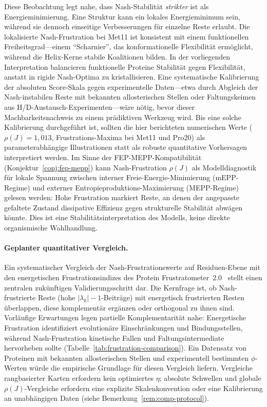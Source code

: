 \documentclass[12pt,a4paper]{article}
\theoremstyle{remark}
\begin{document}
Diese Beobachtung legt nahe, dass Nash-Stabilität \textit{strikter} ist als Energieminimierung. Eine Struktur kann ein lokales Energieminimum sein, während sie dennoch einseitige Verbesserungen für einzelne Reste erlaubt. Die lokalisierte Nash-Frustration bei Met11 ist konsistent mit einem funktionellen Freiheitsgrad---einem ``Scharnier'', das konformationelle Flexibilität ermöglicht, während die Helix-Kerne stabile Koalitionen bilden. In der vorliegenden Interpretation balancieren funktionelle Proteine Stabilität gegen Flexibilität, anstatt in rigide Nash-Optima zu kristallisieren. Eine systematische Kalibrierung der absoluten Score-Skala gegen experimentelle Daten---etwa durch Abgleich der Nash-instabilen Reste mit bekannten allosterischen Stellen oder Faltungskeimen aus H/D-Austausch-Experimenten---wäre nötig, bevor dieser Machbarkeitsnachweis zu einem prädiktiven Werkzeug wird. Bis eine solche Kalibrierung durchgeführt ist, sollten die hier berichteten numerischen Werte ($\rho(J) = 1{,}013$, Frustrations-Maxima bei Met11 und Pro20) als parameterabhängige Illustrationen statt als robuste quantitative Vorhersagen interpretiert werden.
Im Sinne der FEP-MEPP-Kompatibilität (Konjektur~\ref{conj:fep-mepp}) kann Nash-Frustration $\rho(J)$ als Modelldiagnostik für lokale Spannung zwischen interner Freie-Energie-Minimierung (mEPP-Regime) und externer Entropieproduktions-Maximierung (MEPP-Regime) gelesen werden: Hohe Frustration markiert Reste, an denen der angepasste gefaltete Zustand dissipative Effizienz gegen strukturelle Stabilität abwägen könnte. Dies ist eine Stabilitätsinterpretation des Modells, keine direkte organismische Wahlhandlung.

\paragraph{Geplanter quantitativer Vergleich.}
Ein systematischer Vergleich der Nash-Frustrationswerte auf Residuen-Ebene mit den energetischen Frustrationsindizes des Protein Frustratometer~2.0~\cite{ParraFerreiro2016} stellt einen zentralen zukünftigen Validierungsschritt dar. Die Kernfrage ist, ob Nash-frustrierte Reste (hohe $|\lambda_k|-1$-Beiträge) mit energetisch frustrierten Resten überlappen, diese komplementär ergänzen oder orthogonal zu ihnen sind. Vorläufige Erwartungen legen partielle Komplementarität nahe: Energetische Frustration identifiziert evolutionäre Einschränkungen und Bindungsstellen, während Nash-Frustration kinetische Fallen und Faltungsintermediate hervorheben sollte (Tabelle~\ref{tab:frustration-comparison}). Ein Datensatz von Proteinen mit bekannten allosterischen Stellen und experimentell bestimmten $\phi$-Werten würde die empirische Grundlage für diesen Vergleich liefern. Vergleiche rangbasierter Karten erfordern kein optimiertes $\eta$; absolute Schwellen und globale $\rho(J)$-Vergleiche erfordern eine explizite Skalenkonvention oder eine Kalibrierung an unabhängigen Daten (siehe Bemerkung~\ref{rem:comp-protocol}).
\end{document}
